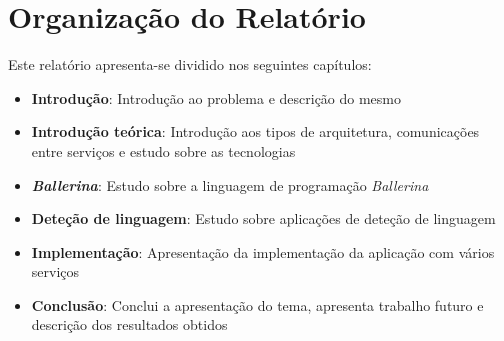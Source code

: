 \section{Organização do Relatório}
\label{sec:Ch1.3}


Este relatório apresenta-se dividido nos seguintes capítulos:

\begin{itemize}
    \item \textbf{Introdução}: Introdução ao problema e descrição do mesmo
    \item \textbf{Introdução teórica}: Introdução aos tipos de arquitetura, comunicações entre serviços e estudo sobre as tecnologias
    \item \textbf{\textit{Ballerina}}: Estudo sobre a linguagem de programação \textit{Ballerina}
    \item \textbf{Deteção de linguagem}: Estudo sobre aplicações de deteção de linguagem
    \item \textbf{Implementação}: Apresentação da implementação da aplicação com vários serviços
    \item \textbf{Conclusão}: Conclui a apresentação do tema, apresenta trabalho futuro e descrição dos resultados obtidos
\end{itemize}



